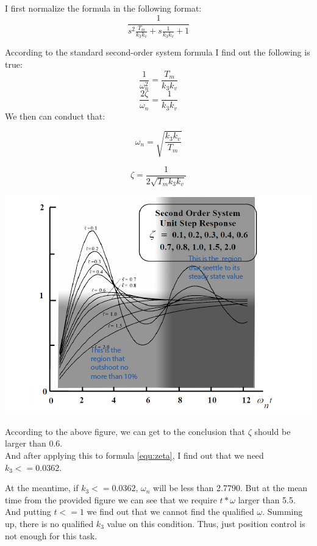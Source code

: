 \documentclass[11pt]{scrartcl}
\begin{document}
I first normalize the formula in the following format:
$$ \frac{1}{s^2\frac{T_m}{k_3k_v}+s\frac{1}{k_3k_v}+1}$$

According to the standard second-order system formula I find out the following is true:
$$\frac{1}{\omega_n^2}=\frac{T_m}{k_3k_v} $$ 
$$\frac{2\zeta}{\omega_n}=\frac{1}{k_3k_v}$$
We then can conduct that:

\begin{equation} \label{equ:omega}
\omega_n= \sqrt{\frac{k_3k_v}{T_m}}
\end{equation}

\begin{equation} \label{equ:zeta}
\zeta = \frac{1}{2\sqrt{T_mk_3k_v}}
\end{equation}

\begin{minipage}[t]{\linewidth}
\label{fig:main}

{
\includegraphics[scale = 1]{vis.png}
}
\end{minipage}
\medskip

According to the above figure, we can get to the conclusion that $\zeta$ should be larger than 0.6.\\

And after applying this to formula \ref{equ:zeta}, I find out that we need $k_3 <=0.0362$.

At the meantime, if $k_3 <=0.0362$, $\omega_n$ will be less than 2.7790. But at the mean time from the provided figure we can see that we require $t*\omega$ larger than 5.5. And putting $t<=1$ we find out that we cannot find the qualified $\omega$. Summing up, there is no qualified $k_3$ value on this condition. Thus, just position control is not enough for this task. 
\end{document}
